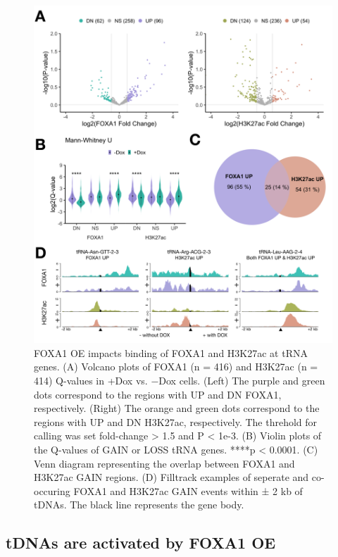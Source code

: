 \documentclass[
  12pt,
]{article}
\begin{document}
\begin{figure}[p]
\includegraphics[width=1\linewidth]{../images/results-02} \caption{FOXA1 OE impacts binding of FOXA1 and H3K27ac at tRNA genes. (A) Volcano plots of FOXA1 (n = 416) and H3K27ac (n = 414) Q-values in +Dox vs. −Dox cells. (Left) The purple and green dots correspond to the regions with UP and DN FOXA1, respectively. (Right) The orange and green dots correspond to the regions with UP and DN H3K27ac, respectively. The threhold for calling was set fold-change > 1.5 and P < 1e-3. (B) Violin plots of the Q-values of GAIN or LOSS tRNA genes. ****p < 0.0001. (C) Venn diagram representing the overlap between FOXA1 and H3K27ac GAIN regions. (D) Filltrack examples of seperate and co-occuring FOXA1 and H3K27ac GAIN events within ± 2 kb of tDNAs. The black line represents the gene body.}\label{fig:results-2}
\end{figure}

\hypertarget{tdnas-are-activated-by-foxa1-oe}{%
\subsection{tDNAs are activated by FOXA1 OE}\label{tdnas-are-activated-by-foxa1-oe}}
\end{document}
